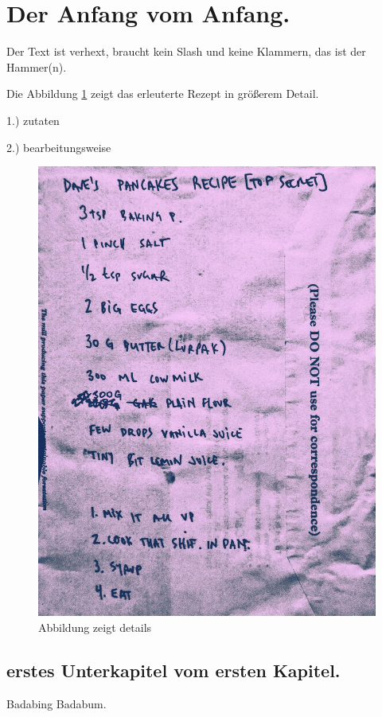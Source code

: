 \documentclass{article}
\begin{document}
    \tableofcontents
        
    \newpage

    \listoffigures
    
    \section{Der Anfang vom Anfang.}
    Der Text ist verhext, braucht kein Slash und keine Klammern, 
    das ist der Hammer(n).
    
        Die Abbildung \ref{fig:DAVES_PANCAKES_RECIPE} zeigt das erleuterte Rezept
        in größerem Detail. 

        1.) zutaten

        2.) bearbeitungsweise

        \begin{figure}[H]
            \centering
            \includegraphics[width=0.5\linewidth]{graphics/DAVES_PANCAKES_RECIPE.jpg}
            \caption[cooles rezept]{Abbildung zeigt details}
    
            
            \label{fig:DAVES_PANCAKES_RECIPE}
        \end{figure}
        
        \subsection {erstes Unterkapitel vom ersten Kapitel.}
        Badabing Badabum.
\end{document}
